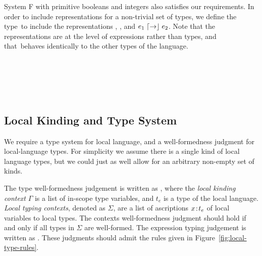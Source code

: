 \begin{ex}[System F]
  \label{ex:system-f}
  System F with primitive booleans and integers also satisfies our requirements.
  In order to include representations for a non-trivial set of types, we define the type~\Typ to include the representations \say{\Int}, \say{\Bool}, and $e_1 \mathrel{\lceil\mathord{\to}\rfloor} e_2$.
  Note that the representations are at the level of expressions rather than types, and that~\Typ behaves identically to the other types of the language.
  \begin{syntax}
  	 \alternative{\alpha} \alternative{\Int} \alternative{\Bool} \alternative{\Typ}\\
  	 
         \\
      \\
    \alternative{\True} \alternative{\False} \\
    \alternative{\say{\Int}} \alternative{\say{\Bool}} 
  \end{syntax}
\end{ex}


\subsection{Local Kinding and Type System}
\label{sec:local-types}
We require a type system for local language, and a well-formedness judgment for local-language types.
For simplicity we assume there is a single kind of local language types, but we could just as well allow for an arbitrary non-empty set of kinds.

The type well-formedness judgement is written as , where the \emph{local kinding context} $\Gamma$ is a list of in-scope type variables, and $t_e$ is a type of the local language.
\emph{Local typing contexts}, denoted as $\Sigma$, are a list of ascriptions $x \mkern2mu{:}\mkern2mu t_e$ of local variables to local types.
The contexts well-formedness judgment \localctxwf{\Gamma}{\Sigma} should hold if and only if all types in $\Sigma$ are well-formed.
The expression typing judgement is written as .
These judgments should admit the rules given in Figure~\ref{fig:local-type-rules}.

